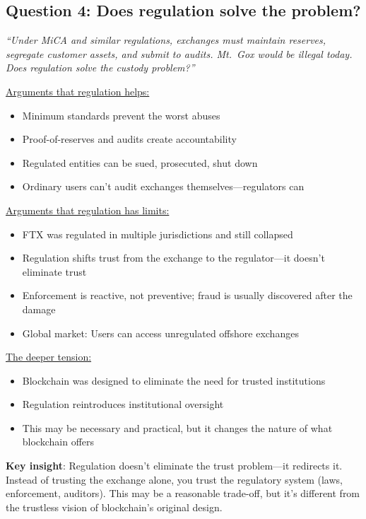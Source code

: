\documentclass[11pt]{article}
\begin{document}
\subsection*{Question 4: Does regulation solve the problem?}

\textit{``Under MiCA and similar regulations, exchanges must maintain reserves, segregate customer assets, and submit to audits. Mt.\ Gox would be illegal today. Does regulation solve the custody problem?''}

\medskip
\noindent\underline{Arguments that regulation helps:}
\begin{itemize}[leftmargin=*]
\item Minimum standards prevent the worst abuses
\item Proof-of-reserves and audits create accountability
\item Regulated entities can be sued, prosecuted, shut down
\item Ordinary users can't audit exchanges themselves---regulators can
\end{itemize}

\medskip
\noindent\underline{Arguments that regulation has limits:}
\begin{itemize}[leftmargin=*]
\item FTX was regulated in multiple jurisdictions and still collapsed
\item Regulation shifts trust from the exchange to the regulator---it doesn't eliminate trust
\item Enforcement is reactive, not preventive; fraud is usually discovered after the damage
\item Global market: Users can access unregulated offshore exchanges
\end{itemize}

\medskip
\noindent\underline{The deeper tension:}
\begin{itemize}[leftmargin=*]
\item Blockchain was designed to eliminate the need for trusted institutions
\item Regulation reintroduces institutional oversight
\item This may be necessary and practical, but it changes the nature of what blockchain offers
\end{itemize}

\medskip
\noindent\textbf{Key insight}: Regulation doesn't eliminate the trust problem---it redirects it. Instead of trusting the exchange alone, you trust the regulatory system (laws, enforcement, auditors). This may be a reasonable trade-off, but it's different from the trustless vision of blockchain's original design.
\end{document}
